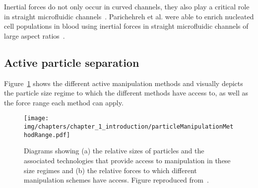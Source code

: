 Inertial forces do not only occur in curved channels, they also play a critical role in straight microfluidic channels~\cite{DiCarlo2009}. Parichehreh et al. were able to enrich nucleated cell populations in blood using inertial forces in straight microfluidic channels of large aspect ratios~\cite{Parichehreh2013}.

\subsection{Active particle separation}
Figure~\ref{fig:particleManipulationMethodRange} shows the different active manipulation methods and visually depicts the particle size regime to which the different methods have access to, as well as the force range each method can apply.

\begin{figure}[htb]
        \centering
		\texttt{[image: img/chapters/chapter\_1\_introduction/particleManipulationMethodRange.pdf]}
        \caption[Particle manipulation methods and manipulation range]{Diagrams showing (a) the relative sizes of particles and the associated technologies that provide access to manipulation in these size regimes and (b) the relative forces to which different manipulation schemes have access. Figure reproduced from~\cite{Erb2009}.}
        \label{fig:particleManipulationMethodRange}
\end{figure}



